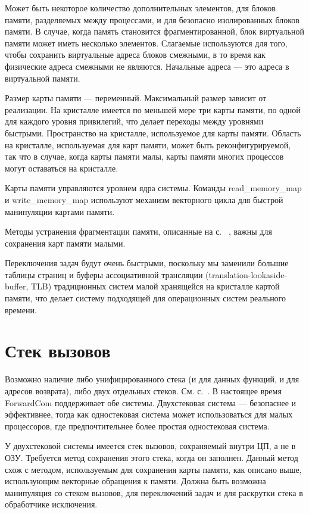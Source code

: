 \documentclass[forwardcom.tex]{subfiles}
\begin{document}
Может быть некоторое количество дополнительных элементов, для блоков памяти, разделяемых между процессами, и для безопасно изолированных блоков памяти. В случае, когда память становится фрагментированной, блок виртуальной памяти может иметь несколько элементов. Слагаемые используются для того, чтобы сохранить виртуальные адреса блоков смежными, в то время как физические адреса смежными не являются. Начальные адреса ---  это адреса в виртуальной памяти.

Размер карты памяти --- переменный. Максимальный размер зависит от реализации. На кристалле имеется по меньшей мере три карты памяти, по одной для каждого уровня привилегий, что делает переходы между уровнями быстрыми. Пространство на кристалле, используемое для карты памяти. Область на кристалле, используемая для карт памяти, может быть реконфигурируемой, так что в случае, когда карты памяти малы, карты памяти многих процессов могут оставаться на кристалле.

Карты памяти управляются уровнем ядра системы. Команды read\_memory\_map и write\_memory\_map используют механизм векторного цикла для быстрой манипуляции картами памяти.

Методы устранения фрагментации памяти, описанные на с.~ \pageref{memoryManagement}, важны для сохранения карт памяти малыми.

Переключения задач будут очень быстрыми, поскольку мы заменили большие таблицы страниц и буферы ассоциативной трансляции (translation-lookaside-buffer, TLB) традиционных систем малой хранящейся на кристалле картой памяти, что делает систему подходящей для операционных систем реального времени.

\section{Стек вызовов}
Возможно наличие либо унифицированного стека (и для данных функций, и для адресов возврата), либо двух отдельных стеков. См. с.~\pageref{callStackAlternatives}. В настоящее время ForwardCom поддерживает обе системы. Двухстековая система --- безопаснее и эффективнее, тогда как одностековая система может использоваться для малых процессоров, где предпочтительнее более простая одностековая система.

У двухстековой системы имеется стек вызовов, сохраняемый внутри ЦП, а не в ОЗУ. Требуется метод сохранения этого стека, когда он заполнен. Данный метод схож с методом, используемым для сохранения карты памяти, как описано выше, использующим векторные обращения к памяти. Должна быть возможна манипуляция со стеком вызовов, для переключений задач и для раскрутки стека в обработчике исключения.
\end{document}

